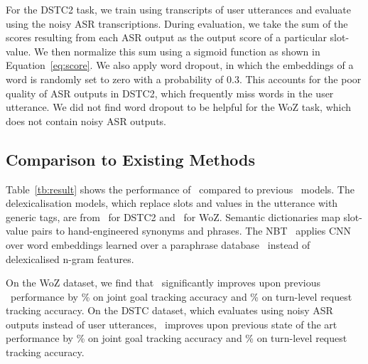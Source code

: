 \documentclass[11pt,a4paper]{article}
\begin{document}
For the DSTC2 task, we train using transcripts of user utterances and evaluate using the noisy ASR transcriptions.
During evaluation, we take the sum of the scores resulting from each ASR output as the output score of a particular slot-value.
We then normalize this sum using a sigmoid function as shown in Equation~\eqref{eq:score}.
We also apply word dropout, in which the embeddings of a word is randomly set to zero with a probability of 0.3.
This accounts for the poor quality of ASR outputs in DSTC2, which frequently miss words in the user utterance.
We did not find word dropout to be helpful for the WoZ task, which does not contain noisy ASR outputs.



\subsection{Comparison to Existing Methods}

Table~\ref{tb:result} shows the performance of \modelnameshort~compared to previous \sota~models.
The delexicalisation models, which replace slots and values in the utterance with generic tags, are from~\citet{henderson2014word} for DSTC2 and~\citet{wen2017NetworkBasedEndToEndDialogueSystem} for WoZ.
Semantic dictionaries map slot-value pairs to hand-engineered synonyms and phrases.
The NBT~\citep{mrkvsic2016neural} applies CNN over word embeddings learned over a paraphrase database~\citep{wieting2015paraphrase} instead of delexicalised n-gram features.

On the WoZ dataset, we find that \modelnameshort~significantly improves upon previous \sota~performance by \goaldiff\% on joint goal tracking accuracy and \requestdiff\% on turn-level request tracking accuracy.
On the DSTC dataset, which evaluates using noisy ASR outputs instead of user utterances, \modelnameshort~improves upon previous state of the art performance by \dstcgoaldiff\% on joint goal tracking accuracy and \dstcrequestdiff\% on turn-level request tracking accuracy.
\end{document}
